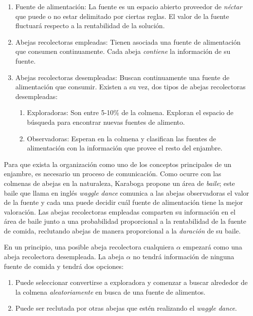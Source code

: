\begin{enumerate}
\item Fuente de alimentación: La fuente es un espacio abierto proveedor de
\textit{néctar} que puede o no estar delimitado por ciertas reglas. El valor
de la fuente fluctuará respecto a la rentabilidad de la solución.

\item Abejas recolectoras empleadas: Tienen asociada una fuente de alimentación que
consumen continuamente. Cada abeja \textit{contiene} la información de su
fuente.

\item Abejas recolectoras desempleadas: Buscan continuamente una fuente de
alimentación que consumir. Existen a su vez, dos tipos de abejas recolectoras
desempleadas:

\begin{enumerate}

\item Exploradoras: Son entre 5-10\% de la colmena. Exploran el espacio de búsqueda
para encontrar nuevas fuentes de alimento.

\item Observadoras: Esperan en la colmena y clasifican las fuentes de
alimentación con la información que provee el resto del enjambre.

\end{enumerate}
\end{enumerate}

Para que exista la organización como uno de los conceptos principales de un
enjambre, es necesario un proceso de comunicación. Como ocurre con las colmenas
de abejas en la naturaleza, Karaboga propone un área de \textit{baile}; este
baile que llama en inglés \textit{waggle dance} comunica a las abejas
observadoras el valor de la fuente y cada una puede decidir cuál fuente de
alimentación tiene la mejor valoración. Las abejas recolectoras empleadas
comparten su información en el área de baile junto a una probabilidad
proporcional a la rentabilidad de la fuente de comida, reclutando abejas
de manera proporcional a la \textit{duración} de su baile.

En un principio, una posible abeja recolectora cualquiera $\alpha$ empezará
como una abeja recolectora desempleada. La abeja $\alpha$ no tendrá información
de ninguna fuente de comida y tendrá dos opciones:

\begin{enumerate}
\item Puede seleccionar convertirse a exploradora y comenzar a buscar alrededor de la
colmena \textit{aleatoriamente} en busca de una fuente de alimentos.
\item Puede ser reclutada por otras abejas que estén realizando el \textit{waggle dance}.
\end{enumerate}

